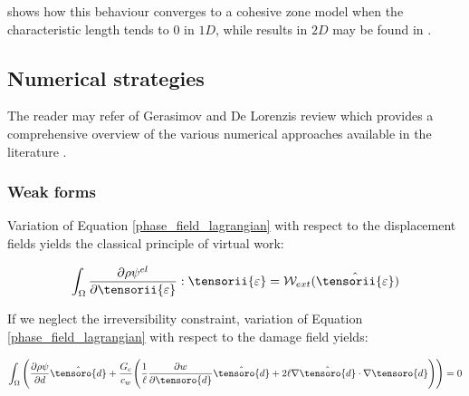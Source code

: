 \cite{lorentz_convergence_2011} shows how this behaviour converges to a
cohesive zone model when the characteristic length tends to $0$ in
$1D$, while results in $2D$ may be found in
\cite{cuvilliez_transition_2011}.

\subsection{Numerical strategies}

The reader may refer of Gerasimov and De Lorenzis review which provides
a comprehensive overview of the various numerical approaches available
in the literature \cite{gerasimov_numerical_2020}.

\subsubsection{Weak forms}

Variation of Equation \eqref{phase_field_lagrangian} with respect to the
displacement fields yields the classical principle of virtual work:

\begin{equation}
    \label{pvw}
    \int_{\Omega} \frac{\partial \rho \psi^{el}}{\partial \tensorii{\varepsilon}} : \tensorii{\varepsilon}
    =
    \mathcal{W}_{ext}(\hat{\tensorii{\varepsilon}})
\end{equation}


If we neglect the irreversibility constraint, variation of Equation
\eqref{phase_field_lagrangian} with respect to the damage field yields:

\begin{equation}
    \label{d}
    \int_{\Omega}
    \Bigg(
        \frac{\partial \rho \psi}{\partial d} \hat{\tensoro{d}}
        +
        \frac{G_c}{c_w}
        \Bigg(
            \frac{1}{\ell} \frac{\partial w}{\partial \tensoro{d}} \hat{\tensoro{d}}
            +
            2 \ell \nabla \hat{\tensoro{d}} \cdot \nabla \tensoro{d}
        \Bigg)
    \Bigg)
    = 0
\end{equation}


